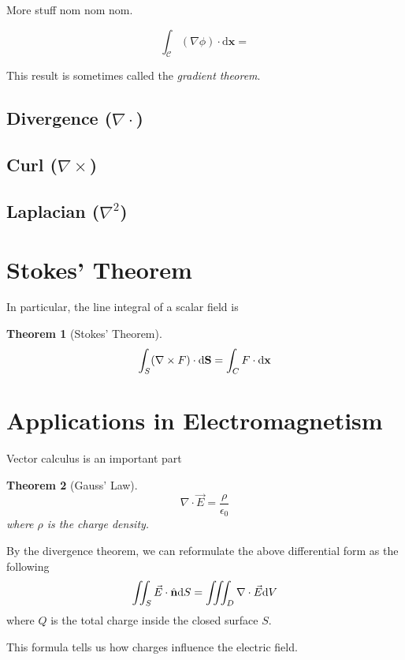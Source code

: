 \documentclass[a4paper]{tufte-handout}
\newtheorem{theorem}{Theorem}
\theoremstyle{definition}
\begin{document}
More stuff nom nom nom.

\begin{equation*}
  \int_{\mathcal{C}}(\nabla \phi) \cdot \mathrm{d} \mathbf{x} = 
\end{equation*}

This result is sometimes called the \textit{gradient theorem}.

\subsection{Divergence ($\nabla \cdot$)}

\subsection{Curl ($\nabla \times$)}

\subsection{Laplacian ($\nabla^2$)}

\section{Stokes' Theorem}

In particular, the line integral of a scalar field is

\begin{theorem}[Stokes' Theorem]

  \begin{equation*}
    \int_{S} (\nabla \times F) \cdot \differential \mathbf{S} = \int_{C} F \cdot \differential \mathbf{x}
  \end{equation*}
  
\end{theorem}

\section{Applications in Electromagnetism}

Vector calculus is an important part 

\begin{theorem}[Gauss' Law]
  \begin{equation*}
    \nabla \cdot \vec{E} = \frac{\rho}{\epsilon_0}
  \end{equation*}
  where $\rho$ is the charge density.
\end{theorem}

By the divergence theorem, we can reformulate the above differential form as the following
\begin{equation*}
  \iint_S \vec{E} \cdot \hat{\mathbf{n}} \differential S = \iiint_D \nabla \cdot \vec{E} \differential V
\end{equation*}
where $Q$ is the total charge inside the closed surface $S$.

This formula tells us how charges influence the electric field.



\end{document}
